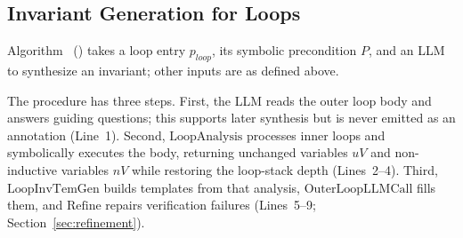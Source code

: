 
\subsection{Invariant Generation for Loops}
Algorithm~ () takes a loop entry $p_{\textit{loop}}$, its symbolic precondition $P$, and an LLM to synthesize an invariant; other inputs are as defined above.

The procedure has three steps. First, the LLM reads the outer loop body and answers guiding questions; this supports later synthesis but is never emitted as an annotation (Line~1). Second, $\mathrm{LoopAnalysis}$ processes inner loops and symbolically executes the body, returning unchanged variables $\textit{uV}$ and non-inductive variables $\textit{nV}$ while restoring the loop-stack depth (Lines~2--4). Third, $\mathrm{LoopInvTemGen}$ builds templates from that analysis, $\mathrm{OuterLoopLLMCall}$ fills them, and $\mathrm{Refine}$ repairs verification failures (Lines~5--9; Section~\ref{sec:refinement}).

